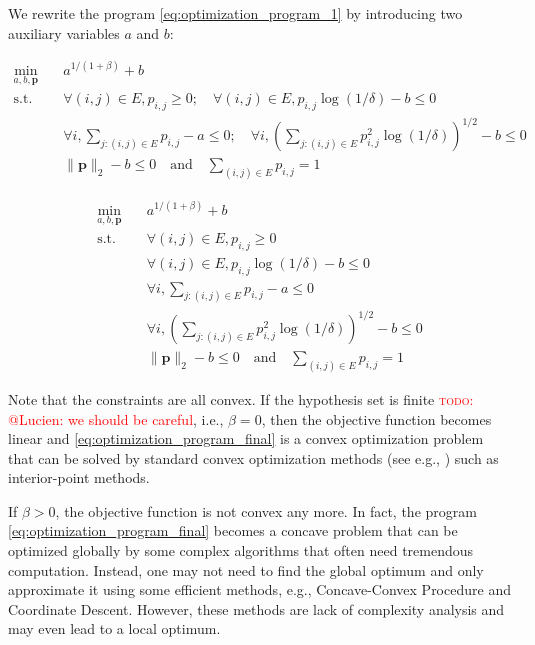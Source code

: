 \documentclass[letterpaper]{article} %
\def\DoubleColumn{}
\def\DoubleColumnEnd{}
\def\SingleColumn{}
\def\SingleColumnEnd{}
\newcommand{\probdistri}{\mathbf{p}}
\newcommand{\pair}[1]{(#1)}
\newcommand{\complexbound}{\beta}
\newcommand{\red}[1]{\textcolor{red}{#1}}
\newcommand{\todo}[1]{\red{\textsc{todo:} #1}}
\begin{document}
We rewrite the program \eqref{eq:optimization_program_1} by introducing two auxiliary variables $a$ and $b$: 
\SingleColumn
\begin{equation}
    \label{eq:optimization_program_final}
\begin{aligned}
    \min_{a,b,\probdistri{}} \quad&
    a^{1/(1+\complexbound{})}+b\\
    \mbox{s.t.} \quad &\forall \pair{i,j}\in E, p_{i,j}\ge 0; \quad \forall \pair{i,j}\in E, p_{i,j}\log(1/\delta) - b \le 0\\
    & \forall i, \sum_{j:\pair{i,j}\in E} p_{i,j} -a  \le 0; \quad \forall i, \left(\sum_{j:\pair{i,j}\in E} p^2_{i,j}\log(1/\delta)\right)^{1/2} -b  \le 0\\
    & \|\probdistri{}\|_2 -b \le 0 \quad \mbox{and} \quad \sum_{\pair{i,j}\in E} p_{i,j}= 1
\end{aligned}
\end{equation}
\SingleColumnEnd
\DoubleColumn
\begin{equation}
    \label{eq:optimization_program_final}
\begin{aligned}
    \min_{a,b,\probdistri{}} \quad&
    a^{1/(1+\complexbound{})}+b\\
    \mbox{s.t.} \quad &\forall \pair{i,j}\in E, p_{i,j}\ge 0 \\
    & \forall \pair{i,j}\in E, p_{i,j}\log(1/\delta) - b \le 0\\
    & \forall i, \sum_{j:\pair{i,j}\in E} p_{i,j} -a  \le 0\\
    & \forall i, \left(\sum_{j:\pair{i,j}\in E} p^2_{i,j}\log(1/\delta)\right)^{1/2} -b  \le 0\\
    & \|\probdistri{}\|_2 -b \le 0 \quad \mbox{and} \quad \sum_{\pair{i,j}\in E} p_{i,j}= 1
\end{aligned}
\end{equation}
\DoubleColumnEnd
Note that the constraints are all convex. 
If the hypothesis set is finite \todo{@Lucien: we should be careful}, i.e., $\complexbound{}=0$, then the objective function becomes linear and \eqref{eq:optimization_program_final} is a convex optimization problem that can be solved by standard convex optimization methods (see e.g., \cite{boyd2004convex}) such as interior-point methods. 

If $\complexbound{}>0$, the objective function is not convex any more. In fact, the program \eqref{eq:optimization_program_final} becomes a concave problem that can be optimized globally by some complex algorithms \cite{benson1995concave,hoffman1981method} that often need tremendous computation. 
Instead, one may not need to find the global optimum and only approximate it using some efficient methods, e.g., Concave-Convex Procedure\cite{Yuille2001The} and Coordinate Descent\cite{wright2015coordinate}.
However, these methods are lack of complexity analysis and may even lead to a local optimum.
\end{document}
